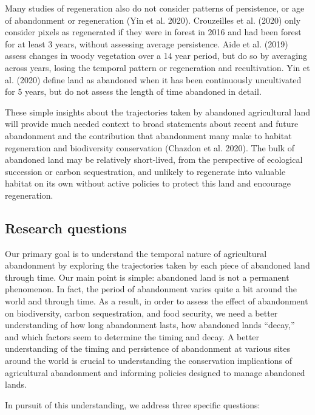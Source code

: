 \documentclass[
]{article}
\begin{document}
Many studies of regeneration also do not consider patterns of persistence, or age of abandonment or regeneration (Yin et al. 2020).
Crouzeilles et al. (2020) only consider pixels as regenerated if they were in forest in 2016 and had been forest for at least 3 years, without assessing average persistence.
Aide et al. (2019) assess changes in woody vegetation over a 14 year period, but do so by averaging across years, losing the temporal pattern or regeneration and recultivation.
Yin et al. (2020) define land as abandoned when it has been continuously uncultivated for 5 years, but do not assess the length of time abandoned in detail.

These simple insights about the trajectories taken by abandoned agricultural land will provide much needed context to broad statements about recent and future abandonment and the contribution that abandonment many make to habitat regeneration and biodiversity conservation (Chazdon et al. 2020).
The bulk of abandoned land may be relatively short-lived, from the perspective of ecological succession or carbon sequestration, and unlikely to regenerate into valuable habitat on its own without active policies to protect this land and encourage regeneration.

\hypertarget{research-questions}{%
\subsection{Research questions}\label{research-questions}}

Our primary goal is to understand the temporal nature of agricultural abandonment by exploring the trajectories taken by each piece of abandoned land through time.
Our main point is simple: abandoned land is not a permanent phenomenon.
In fact, the period of abandonment varies quite a bit around the world and through time.
As a result, in order to assess the effect of abandonment on biodiversity, carbon sequestration, and food security, we need a better understanding of how long abandonment lasts, how abandoned lands ``decay,'' and which factors seem to determine the timing and decay.
A better understanding of the timing and persistence of abandonment at various sites around the world is crucial to understanding the conservation implications of agricultural abandonment and informing policies designed to manage abandoned lands.

In pursuit of this understanding, we address three specific questions:
\end{document}
